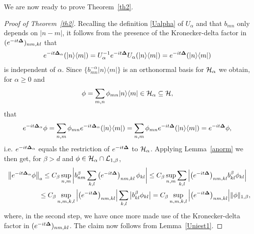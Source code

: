 We are now ready to prove Theorem~\ref{th2}.

\begin{proof}[Proof of Theorem~\ref{th2}]
Recalling the def\/inition \eqref{Ualpha} of $U_\alpha$ and that
$b_{mn}$ only depends on $|n-m|$, it follows from the presence of the
Kronecker-delta factor in $(e^{-it{\bf{\Delta}}})_{nm,kl}$ that
\[
e^{-it{\bf{\Delta}}_\alpha}(|n\rangle\langle m|) = U_\alpha^{-1}
e^{-it{\bf{\Delta}}}U_\alpha(|n\rangle\langle m|) = e^{-it{\bf{\Delta}}}(|n\rangle\langle m|)
\]
is independent of $\alpha$. Since
$\{b_{mn}^{-\alpha}|n\rangle\langle m|\}$ is an orthonormal basis
for ${\cal H}_\alpha$ we obtain, for $\alpha\geq 0$ and
\[
\phi =
\sum_{m,n}\phi_{mn}|n\rangle\langle m| \in {\cal H}_\alpha\subseteq
{\cal H} ,
\]
that
\[
e^{-it{\bf{\Delta}}_\alpha}\phi =
\sum_{n,m}\phi_{mn}e^{-it{\bf{\Delta}}_\alpha}(|n\rangle\langle m|) =
\sum_{n,m}\phi_{mn}e^{-it{\bf{\Delta}}}(|n\rangle\langle m|) = e^{-it{\bf{\Delta}}}\phi ,
\]
i.e. $e^{-it{\bf{\Delta}}_\alpha}$ equals the restriction of $e^{-it{\bf{\Delta}}}$
to ${\cal H}_\alpha$.
Applying  Lemma~\ref{anorm} we then get, for $\beta>d$ and
$\phi\in {\cal H}_\alpha\cap {\cal L}_{1,\beta}$,
\begin{gather*}
\big\Vert e^{-it{\bf{\Delta}}_\alpha}\phi\big\Vert_a
 \leq
 C_\beta \sup_{n,m}\bigg|b_{nm}^{\beta}
\sum_{k,l}\big(e^{-it{\bf{\Delta}}}\big)_{nm,kl}\,\phi_{kl}\bigg|
 \leq C_\beta \sup_{n,m}\sum_{k,l}\Big|
\big(e^{-it{\bf{\Delta}}}\big)_{nm,kl} b_{kl}^{\beta} \phi_{kl}\Big|\\
\phantom{\big\Vert e^{-it{\bf{\Delta}}_\alpha}\phi\big\Vert_a}{}
\leq
C_\beta \sup_{n,m,k,l}\Big|\big(e^{-it{\bf{\Delta}}}\big)_{nm,kl}\Big| \sum_{k,l}\big|b_{kl}^{\beta} \phi_{kl}\big|
= C_\beta \sup_{n,m,k,l}\Big|\big(e^{-it{\bf{\Delta}}}\big)_{nm,kl}\Big|
\Vert\phi\Vert_{1,\beta} ,
\end{gather*}
where, in the second step, we have once more made use of the
Kronecker-delta factor in $(e^{-it{\bf{\Delta}}})_{nm,kl}$.
The claim now follows from Lemma~\ref{Uniest1}.
\end{proof}
